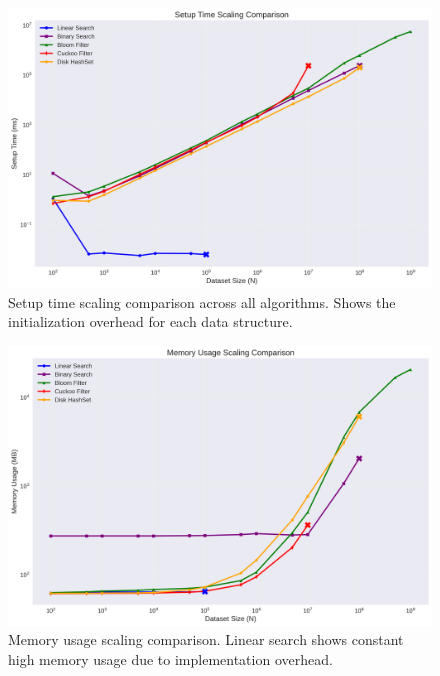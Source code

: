 \documentclass[sigconf]{acmart}
\begin{document}
\begin{figure}[h]
\centering
\includegraphics[width=0.95\linewidth]{setup-time-scaling}
\caption{Setup time scaling comparison across all algorithms. Shows the initialization overhead for each data structure.}
\label{fig:setup-time-scaling}
\end{figure}

\begin{figure}[h]
\centering
\includegraphics[width=0.95\linewidth]{memory-usage-scaling}
\caption{Memory usage scaling comparison. Linear search shows constant high memory usage due to implementation overhead.}
\label{fig:memory-usage-scaling}
\end{figure}
\end{document}
